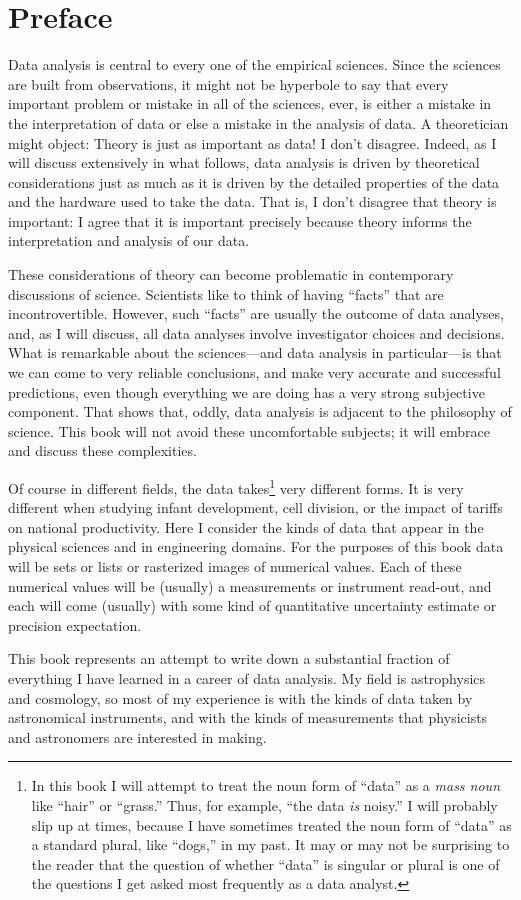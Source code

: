 \chapter*{Preface}
Data analysis is central to every one of the empirical sciences.
Since the sciences are built from observations, it might not be hyperbole to say that every important problem or mistake in all of the sciences, ever, is either a mistake in the interpretation of data or else a mistake in the analysis of data.
A theoretician might object: Theory is just as important as data!
I don't disagree.
Indeed, as I will discuss extensively in what follows, data analysis is driven by theoretical considerations just as much as it is driven by the detailed properties of the data and the hardware used to take the data.
That is, I don't disagree that theory is important:
I agree that it is important precisely because theory informs the interpretation and analysis of our data.

These considerations of theory can become problematic in contemporary discussions of science.
Scientists like to think of having ``facts'' that are incontrovertible.
However, such ``facts'' are usually the outcome of data analyses, and, as I will discuss, all data analyses involve investigator choices and decisions.
What is remarkable about the sciences---and data analysis in particular---is that we can come to very reliable conclusions, and make very accurate and successful predictions, even though everything we are doing has a very strong subjective component.
That shows that, oddly, data analysis is adjacent to the philosophy of science.
This book will not avoid these uncomfortable subjects; it will embrace and discuss these complexities.

Of course in different fields, the data takes\footnote{%
In this book I will attempt to treat the noun form of ``data'' as a \emph{mass noun} like ``hair'' or ``grass.''
Thus, for example, ``the data \emph{is} noisy.''
I will probably slip up at times, because I have sometimes treated the noun form of ``data'' as a standard plural, like ``dogs,'' in my past.
It may or may not be surprising to the reader that the question of whether ``data'' is singular or plural is one of the questions I get asked most frequently as a data analyst.}
very different forms.
It is very different when studying infant development, cell division, or the impact of tariffs on national productivity.
Here I consider the kinds of data that appear in the physical sciences and in engineering domains.
For the purposes of this book data will be sets or lists or rasterized images of numerical values.
Each of these numerical values will be (usually) a measurements or instrument read-out,
and each will come (usually) with some kind of quantitative uncertainty estimate or precision expectation.

This book represents an attempt to write down a substantial fraction of everything I have learned in a career of data analysis.
My field is astrophysics and cosmology, so most of my experience is with the kinds of data taken by astronomical instruments, and with the kinds of measurements that physicists and astronomers are interested in making.
